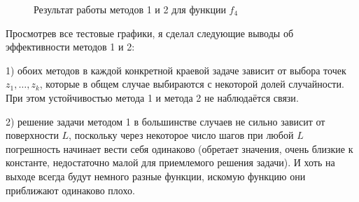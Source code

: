 \documentclass[a4paper]{article}
\begin{document}
\begin{figure}[h!]
  \caption{Результат работы методов 1 и 2 для функции $f_4$}
  \label{send}
\end{figure}

\FloatBarrier
Просмотрев все тестовые графики, я сделал следующие выводы об эффективности методов 1 и 2:

  1) { обоих методов в каждой конкретной краевой задаче зависит от выбора точек $z_1, \dots, z_k$}, которые в общем случае выбираются с некоторой долей случайности. При этом { устойчивостью метода 1 и метода 2 не наблюдаётся связи}.
  
  2) { решение задачи методом 1 в большинстве случаев не сильно зависит от поверхности $L$, поскольку через некоторое число шагов при любой $L$ погрешность начинает вести себя одинаково} (обретает значения, очень близкие к константе, недостаточно малой для приемлемого решения задачи). И хоть на выходе всегда будут немного разные функции, искомую функцию они приближают одинаково плохо.
  
\end{document}
